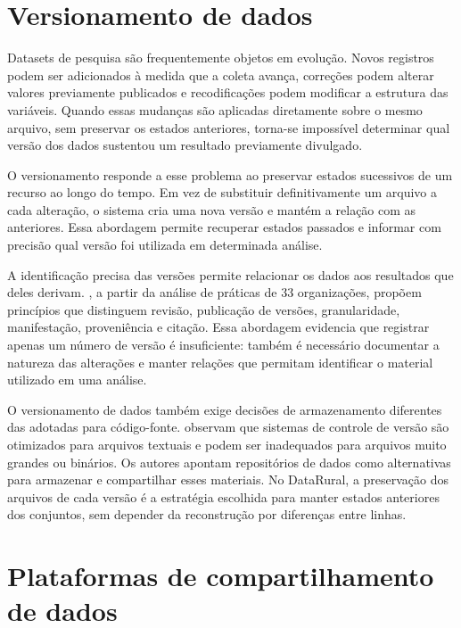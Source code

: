 \section{Versionamento de dados}\label{sec:versionamento}

Datasets de pesquisa são frequentemente objetos em evolução. Novos registros podem ser adicionados à medida que a coleta avança, correções podem alterar valores previamente publicados e recodificações podem modificar a estrutura das variáveis. Quando essas mudanças são aplicadas diretamente sobre o mesmo arquivo, sem preservar os estados anteriores, torna-se impossível determinar qual versão dos dados sustentou um resultado previamente divulgado.

O versionamento responde a esse problema ao preservar estados sucessivos de um recurso ao longo do tempo. Em vez de substituir definitivamente um arquivo a cada alteração, o sistema cria uma nova versão e mantém a relação com as anteriores. Essa abordagem permite recuperar estados passados e informar com precisão qual versão foi utilizada em determinada análise.

A identificação precisa das versões permite relacionar os dados aos resultados que deles derivam. , a partir da análise de práticas de 33 organizações, propõem princípios que distinguem revisão, publicação de versões, granularidade, manifestação, proveniência e citação. Essa abordagem evidencia que registrar apenas um número de versão é insuficiente: também é necessário documentar a natureza das alterações e manter relações que permitam identificar o material utilizado em uma análise.

O versionamento de dados também exige decisões de armazenamento diferentes das adotadas para código-fonte.  observam que sistemas de controle de versão são otimizados para arquivos textuais e podem ser inadequados para arquivos muito grandes ou binários. Os autores apontam repositórios de dados como alternativas para armazenar e compartilhar esses materiais. No DataRural, a preservação dos arquivos de cada versão é a estratégia escolhida para manter estados anteriores dos conjuntos, sem depender da reconstrução por diferenças entre linhas.

\section{Plataformas de compartilhamento de dados}\label{sec:plataformas}

